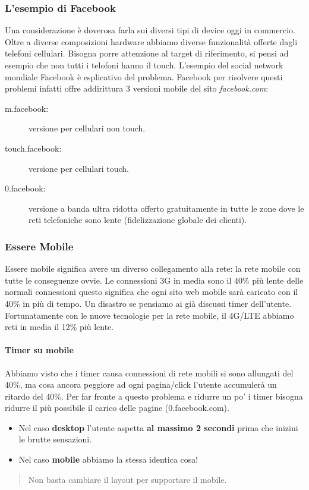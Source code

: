		\subsubsection{L'esempio di Facebook}
			Una considerazione è doverosa farla sui diversi tipi di device oggi in commercio. Oltre a diverse composizioni hardware abbiamo diverse funzionalità offerte dagli telefoni cellulari. Bisogna porre attenzione al target di riferimento, si pensi ad esempio che non tutti i telofoni hanno il touch.
			L'esempio del social network mondiale Facebook è esplicativo del problema. Facebook per risolvere questi problemi infatti offre addirittura 3 versioni mobile del sito \emph{facebook.com}:
			\begin{description}
				\item [m.facebook:] versione per cellulari non touch.
				\item [touch.facebook:] versione per cellulari touch.
				\item [0.facebook:] versione a banda ultra ridotta offerto gratuitamente in tutte le zone dove le reti telefoniche sono lente (fidelizzazione globale dei clienti).		
			\end{description}
		
		\subsubsection{Essere Mobile}
			Essere mobile significa avere un diverso collegamento alla rete: la rete mobile con tutte le conseguenze ovvie.
			Le connessioni 3G in media sono il 40\% più lente delle normali connessioni questo significa che ogni sito web mobile sarà caricato con il 40\% in più di tempo. Un disastro se pensiamo ai già discussi timer dell'utente. Fortunatamente con le nuove tecnologie per la rete mobile, il 4G/LTE abbiamo reti in media il 12\% più lente.
			
			\paragraph{Timer su mobile}
				Abbiamo visto che i timer causa connessioni di rete mobili si sono allungati del 40\%, ma cosa ancora peggiore ad ogni pagina/click l'utente accumulerà un ritardo del 40\%. Per far fronte a questo problema e ridurre un po' i timer bisogna ridurre il più possibile il carico delle pagine (0.facebook.com). 
				\begin{itemize}
					\item Nel caso \textbf{desktop} l'utente aspetta \textbf{al massimo 2 secondi} prima che inizini le brutte sensazioni.
					\item Nel caso \textbf{mobile} abbiamo la stessa identica cosa!
				\end{itemize}
				\begin{quote}
					Non basta cambiare il layout per supportare il mobile.  
				\end{quote}
